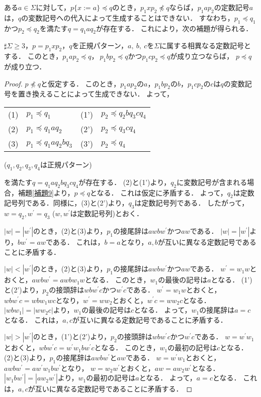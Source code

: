 ある$a \in  \Sigma$に対して，$p \{ x:=a \} \preceq q$のとき，$p_{1}xp_{2} \not \preceq q$ならば，$p_{1}ap_{2}$の定数記号$a$は，$q$の変数記号への代入によって生成することはできない．
すなわち，$p_{1} \preceq q_{1}$かつ$p_{2} \preceq q_{2}$を満たす$q=q_{1}aq_{2}$が存在する．
これにより，次の補題が得られる．
\begin{lem}\label{補題10}
$\sharp \Sigma \ge 3$，$p=p_{1}xp_{2}，q$を正規パターン，$a,~b,~c$を$\Sigma$に属する相異なる定数記号とする．
このとき，$p_{1}ap_{2} \preceq q$，$\ p_{1}bp_{2} \preceq q$かつ$p_{1}cp_{2} \preceq q$が成り立つならば，
$p\preceq q$が成り立つ．
\end{lem}
\begin{proof}
$p \not \preceq q$と仮定する．
このとき，$p_{1}ap_{2}$の$a$，$p_{1}bp_{2}$の$b$，$p_{1}cp_{2}$の$c$は$q$の変数記号を置き換えることによって生成できない．
よって，
\medskip

\begin{tabular}{llll}
(1) & $p_{1} \preceq q_{1}$ & (1') & $p_{2} \preceq q_{2}bq_{3}cq_{4}$ \\
(2) & $p_{1} \preceq q_{1}aq_{2}$ & (2') & $p_{2} \preceq q_{3}cq_{4}$ \\
(3) & $p_{1} \preceq q_{1}aq_{2}bq_{3}$ & (3') & $p_{2} \preceq q_{4}$
\end{tabular}	
\indent ($q_{1}, q_{2}, q_{3}, q_{4}$は正規パターン) 	
\medskip

\noindent を満たす$q=q_{1}aq_{2}bq_{3}cq_{4}$が存在する．
(2)と(1')より，$q_{2}$に変数記号が含まれる場合，補題\ref{補題9}より，$p \preceq q$となる．
これは仮定に矛盾する．
よって，$q_{2}$は定数記号列である．同様に，(3)と(2')より，$q_{3}$は定数記号列である．
したがって，$w=q_{2}, w^{\prime}=q_{3}$ ($w, w^{\prime}$は定数記号列)とおく．

$|w|=|w^{\prime}|$のとき，(2)と(3)より，$p_{1}$の接尾辞は$awbw^{\prime}$かつ$aw$である．
$|w|=|w^{\prime}|$より，$bw^{\prime}=aw$である．
これは，$b=a$となり，$a, b$が互いに異なる定数記号であることに矛盾する．

$|w| < |w^{\prime}|$のとき，(2)と(3)より，$p_{1}$の接尾辞は$awbw^{\prime}$かつ$aw$である．
$w^{\prime}=w_{1}w$とおくと，$awbw^{\prime}=awbw_{1}w$となる．
このとき，$w_{1}$の最後の記号は$a$となる．
(1')と(2')より，$p_{2}$の接頭辞は$wbw^{\prime}c$かつ$w^{\prime}c$である．
$w^{\prime}=w_{1}w$とおくと，$wbw^{\prime}c=wbw_{1}wc$となり，$w^{\prime}=ww_{2}$とおくと，$w^{\prime}c=ww_{2}c$となる．
$|wbw_{1}|=|ww_{2}c|$より，$w_{1}$の最後の記号は$c$となる．
よって，$w_{1}$の接尾辞は$a=c$となる．
これは，$a, c$が互いに異なる定数記号であることに矛盾する．

$|w| > |w^{\prime}|$のとき，(1')と(2')より，$p_{2}$の接頭辞は$wbw^{\prime}c$かつ$w^{\prime}c$である．
$w=w^{\prime}w_{1}$とおくと，$wbw^{\prime}c=w^{\prime}w_{1}bw^{\prime}c$となる．
このとき，$w_{1}$の最初の記号は$c$となる．
(2)と(3)より，$p_{1}$の接尾辞は$awbw^{\prime}$と$aw$である．
$w=w^{\prime}w_{1}$とおくと，$awbw^{\prime}=aw^{\prime}w_{1}bw^{\prime}$となり， $w=w_{2}w^{\prime}$とおくと，$aw=aw_{2}w^{\prime}$となる．
$|w_{1}bw^{\prime}|=|aw_{2}w^{\prime}|$より，$w_{1}$の最初の記号は$a$となる．
よって，$a=c$となる．
これは，$a, c$が互いに異なる定数記号であることに矛盾する．
\end{proof}
